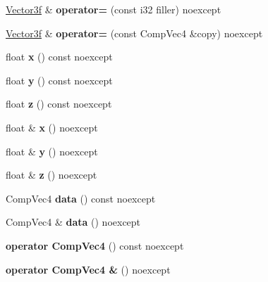 \begin{DoxyCompactItemize}
\mbox{\hyperlink{class_vector3f}{Vector3f}} \& {\bfseries operator=} (const i32 filler) noexcept
\item 
\mbox{\label{class_vector3f_a1006fa2a3639ae7e8649ebb860018b69}} 
\mbox{\hyperlink{class_vector3f}{Vector3f}} \& {\bfseries operator=} (const Comp\+Vec4 \&copy) noexcept
\item 
\mbox{\label{class_vector3f_a566ac4e4e5715603b3e223493e0ea69c}} 
float {\bfseries x} () const noexcept
\item 
\mbox{\label{class_vector3f_a22720415e42546a611b930a7df983086}} 
float {\bfseries y} () const noexcept
\item 
\mbox{\label{class_vector3f_a48cc596b0a649c142009c76f7cd4744c}} 
float {\bfseries z} () const noexcept
\item 
\mbox{\label{class_vector3f_afa3ffe0ecd24ffd3390751fc4f1484c9}} 
float \& {\bfseries x} () noexcept
\item 
\mbox{\label{class_vector3f_a5a06e1be3e79f5e7b9042dcfe46c667c}} 
float \& {\bfseries y} () noexcept
\item 
\mbox{\label{class_vector3f_a16212f4681911cc81a3f6209807ca3ad}} 
float \& {\bfseries z} () noexcept
\item 
\mbox{\label{class_vector3f_ab4c695a15779fb8963ecf49b53c994ab}} 
Comp\+Vec4 {\bfseries data} () const noexcept
\item 
\mbox{\label{class_vector3f_a4f9ddb65d252b26ede9acec335f338f6}} 
Comp\+Vec4 \& {\bfseries data} () noexcept
\item 
\mbox{\label{class_vector3f_ac278f1d3dca951774ca77dbd9350367f}} 
{\bfseries operator Comp\+Vec4} () const noexcept
\item 
\mbox{\label{class_vector3f_a32a93d66903416a2e7f6e18b900ef986}} 
{\bfseries operator Comp\+Vec4 \&} () noexcept
\item 
\mbox{\label{class_vector3f_abebb5adb6603e8d0bc54c426bd034eab}} 

\end{DoxyCompactItemize}
